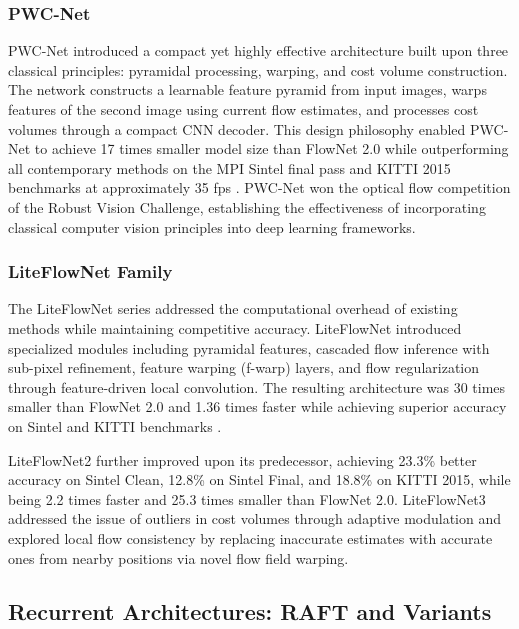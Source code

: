 \subsubsection{PWC-Net}

PWC-Net \cite{sun2018pwcnet} introduced a compact yet highly effective architecture built upon three classical principles: pyramidal processing, warping, and cost volume construction. The network constructs a learnable feature pyramid from input images, warps features of the second image using current flow estimates, and processes cost volumes through a compact CNN decoder. This design philosophy enabled PWC-Net to achieve 17 times smaller model size than FlowNet 2.0 while outperforming all contemporary methods on the MPI Sintel final pass and KITTI 2015 benchmarks at approximately 35 fps \cite{sun2018pwcnet}. PWC-Net won the optical flow competition of the Robust Vision Challenge, establishing the effectiveness of incorporating classical computer vision principles into deep learning frameworks.

\subsubsection{LiteFlowNet Family}

The LiteFlowNet series \cite{hui2018liteflownet,hui2020liteflownet2,hui2020liteflownet3} addressed the computational overhead of existing methods while maintaining competitive accuracy. LiteFlowNet \cite{hui2018liteflownet} introduced specialized modules including pyramidal features, cascaded flow inference with sub-pixel refinement, feature warping (f-warp) layers, and flow regularization through feature-driven local convolution. The resulting architecture was 30 times smaller than FlowNet 2.0 and 1.36 times faster while achieving superior accuracy on Sintel and KITTI benchmarks \cite{hui2018liteflownet}.

LiteFlowNet2 \cite{hui2020liteflownet2} further improved upon its predecessor, achieving 23.3\% better accuracy on Sintel Clean, 12.8\% on Sintel Final, and 18.8\% on KITTI 2015, while being 2.2 times faster and 25.3 times smaller than FlowNet 2.0. LiteFlowNet3 \cite{hui2020liteflownet3} addressed the issue of outliers in cost volumes through adaptive modulation and explored local flow consistency by replacing inaccurate estimates with accurate ones from nearby positions via novel flow field warping.

\subsection{Recurrent Architectures: RAFT and Variants}

